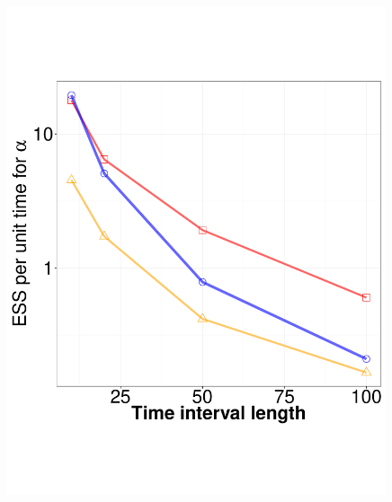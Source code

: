 {\begin{figure}
\begin{minipage}[hp]{0.24\linewidth}
    \includegraphics [width=0.99\textwidth, angle=0]{figs/ESS_vs_t_alpha.pdf}
      \end{minipage}
  \begin{minipage}[hp]{0.24\linewidth}
  \centering

\end{minipage}
\end{figure}}
